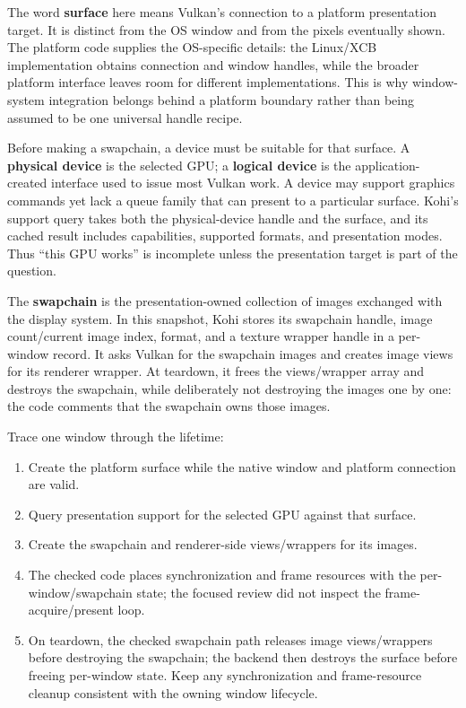 The word \textbf{surface} here means Vulkan's connection to a platform presentation target. It is distinct from the OS window and from the pixels eventually shown. The platform code supplies the OS-specific details: the Linux/XCB implementation obtains connection and window handles, while the broader platform interface leaves room for different implementations. This is why window-system integration belongs behind a platform boundary rather than being assumed to be one universal handle recipe.

Before making a swapchain, a device must be suitable for that surface. A \textbf{physical device} is the selected GPU; a \textbf{logical device} is the application-created interface used to issue most Vulkan work. A device may support graphics commands yet lack a queue family that can present to a particular surface. Kohi's support query takes both the physical-device handle and the surface, and its cached result includes capabilities, supported formats, and presentation modes. Thus ``this GPU works'' is incomplete unless the presentation target is part of the question.

The \textbf{swapchain} is the presentation-owned collection of images exchanged with the display system. In this snapshot, Kohi stores its swapchain handle, image count/current image index, format, and a texture wrapper handle in a per-window record. It asks Vulkan for the swapchain images and creates image views for its renderer wrapper. At teardown, it frees the views/wrapper array and destroys the swapchain, while deliberately not destroying the images one by one: the code comments that the swapchain owns those images.

Trace one window through the lifetime:

\begin{enumerate}
\def\labelenumi{\arabic{enumi}.}
\tightlist
\item
  Create the platform surface while the native window and platform connection are valid.
\item
  Query presentation support for the selected GPU against that surface.
\item
  Create the swapchain and renderer-side views/wrappers for its images.
\item
  The checked code places synchronization and frame resources with the per-window/swapchain state; the focused review did not inspect the frame-acquire/present loop.
\item
  On teardown, the checked swapchain path releases image views/wrappers before destroying the swapchain; the backend then destroys the surface before freeing per-window state. Keep any synchronization and frame-resource cleanup consistent with the owning window lifecycle.
\end{enumerate}

